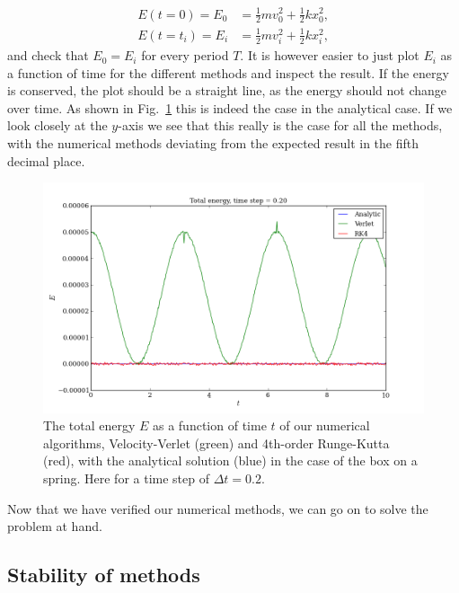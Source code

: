 \documentclass{article}
\begin{document}
\begin{multicols}{2}
\begin{equation}
	\begin{aligned}
		E(t = 0) = E_0 &= \frac{1}{2}mv_0^2 + \frac{1}{2}kx_0^2, \\
		E(t = t_i) = E_i &= \frac{1}{2}mv_i^2 + \frac{1}{2}kx_i^2,
	\end{aligned}
\end{equation}
and check that $E_0 = E_i$ for every period $T$. It is however easier to just plot $E_i$ as a function of time for the different methods and inspect the result. If the energy is conserved, the plot should be a straight line, as the energy should not change over time. As shown in Fig.~\ref{fig:analytical_energy} this is indeed the case in the analytical case. If we look closely at the $y$-axis we see that this really is the case for all the methods, with the numerical methods deviating from the expected result in the fifth decimal place. \\

\begin{figure}[t!]
\begin{center}
  	\includegraphics[width=130mm]{Images/energy_conservation.png}
\caption{The total energy $E$ as a function of time $t$ of our numerical algorithms, Velocity-Verlet (green) and 4th-order Runge-Kutta (red), with the analytical solution (blue) in the case of the box on a spring. Here for a time step of $\Delta t = 0.2$.}\label{fig:analytical_energy}
\end{center}
\end{figure}

\noindent Now that we have verified our numerical methods, we can go on to solve the problem at hand.



\subsection{Stability of methods}


\end{multicols}
\end{document}
